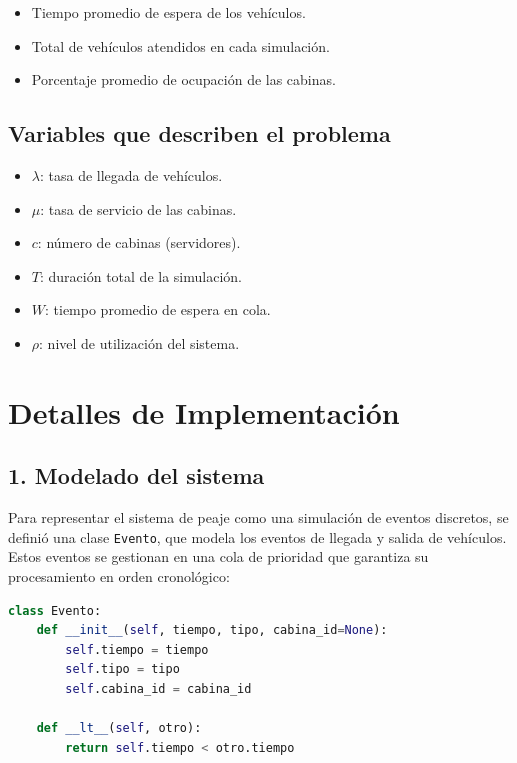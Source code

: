 \documentclass[12pt]{article}
\begin{document}
\begin{itemize}
    \item Tiempo promedio de espera de los vehículos.
    \item Total de vehículos atendidos en cada simulación.
    \item Porcentaje promedio de ocupación de las cabinas.
\end{itemize}

\subsection*{Variables que describen el problema}
\begin{itemize}
    \item $\lambda$: tasa de llegada de vehículos.
    \item $\mu$: tasa de servicio de las cabinas.
    \item $c$: número de cabinas (servidores).
    \item $T$: duración total de la simulación.
    \item $W$: tiempo promedio de espera en cola.
    \item $\rho$: nivel de utilización del sistema.
\end{itemize}

\section{Detalles de Implementación}

\subsection*{1. Modelado del sistema}

Para representar el sistema de peaje como una simulación de eventos discretos, se definió una clase \texttt{Evento}, que modela los eventos de llegada y salida de vehículos. Estos eventos se gestionan en una cola de prioridad que garantiza su procesamiento en orden cronológico:

\begin{lstlisting}[language=Python, caption={Definición de la clase Evento}]
class Evento:
    def __init__(self, tiempo, tipo, cabina_id=None):
        self.tiempo = tiempo
        self.tipo = tipo
        self.cabina_id = cabina_id

    def __lt__(self, otro):
        return self.tiempo < otro.tiempo
\end{lstlisting}
\end{document}
